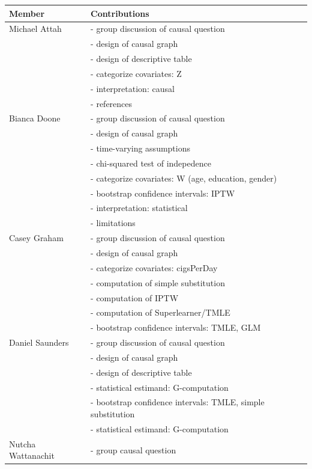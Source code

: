 \documentclass[]{article}
\begin{document}
\begin{table}[h!]
  \begin{tabular}{|l|l|}
  \hline
    Member & Contributions \\ \hline
    Michael Attah & - group discussion of causal question \\
      & - design of causal graph \\
      & - design of descriptive table \\
      & - categorize covariates: Z\\
      & - interpretation: causal\\ 
      & - references \\ \hline
    Bianca Doone & - group discussion of causal question \\
      & - design of causal graph \\
      & - time-varying assumptions \\
      & - chi-squared test of indepedence\\
      & - categorize covariates: W (age, education, gender) \\
      & - bootstrap confidence intervals: IPTW \\
      & - interpretation: statistical \\
      & - limitations \\ \hline
    Casey Graham & - group discussion of causal question \\
      & - design of causal graph \\
      & - categorize covariates: cigsPerDay \\
      & - computation of simple substitution \\
      & - computation of IPTW \\
      & - computation of Superlearner/TMLE \\ 
      & - bootstrap confidence intervals: TMLE, GLM \\ \hline
    Daniel Saunders & - group discussion of causal question \\
      & - design of causal graph \\
      & - design of descriptive table \\
      & - statistical estimand: G-computation \\
      & - bootstrap confidence intervals: TMLE, simple substitution\\ 
      & - statistical estimand: G-computation \\ \hline
    Nutcha Wattanachit & - group causal question \\

\end{tabular}
\end{table}
\end{document}
